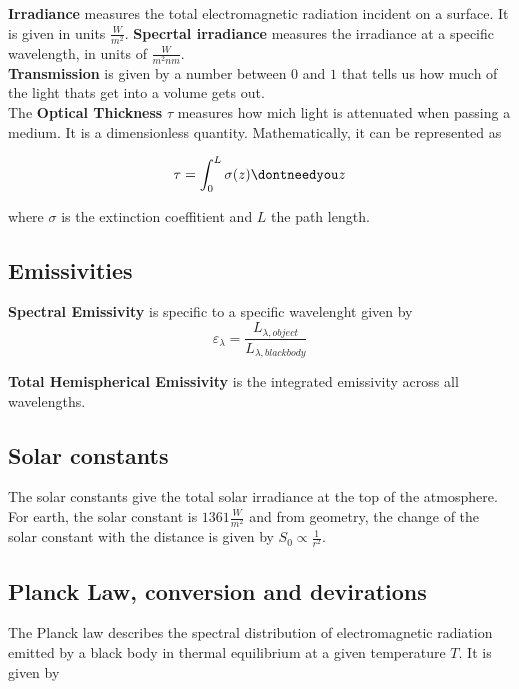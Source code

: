 \documentclass[12pt, a4paper]{article} %
\let\d\dontneedyou
\DeclareMathOperator{\d}{d}
\begin{document}
\textbf{Irradiance} measures the total electromagnetic radiation incident on a surface. It is given in units $\frac{W}{m^2}$. \textbf{Specrtal irradiance} measures the irradiance at a specific wavelength, in units of $\frac{W}{m^2nm}$. \\

\textbf{Transmission} is given by a number between $0$ and $1$ that tells us how much of the light thats get into a volume gets out. \\

The \textbf{Optical Thickness} $\tau$ measures how mich light is attenuated when passing a medium. It is a dimensionless quantity. Mathematically, it can be represented as

\begin{equation}
	\tau = \int_0^L \sigma(z) \d z
\end{equation}

where $\sigma$ is the extinction coeffitient and $L$ the path length.

\subsection{Emissivities}

\textbf{Spectral Emissivity} is specific to a specific wavelenght given by
\begin{equation}
	\varepsilon_\lambda= \frac{L_{\lambda, object}}{L_{\lambda, blackbody}}
\end{equation}

\textbf{Total Hemispherical Emissivity} is the integrated emissivity across all wavelengths.

\subsection{Solar constants}

The solar constants give the total solar irradiance at the top of the atmosphere. For earth, the solar constant is $1361 \frac{W}{m^2}$ and from geometry, the change of the solar constant with the distance is given by $S_0 \propto \frac{1}{r^2}$.

\subsection{Planck Law, conversion and devirations}

The Planck law describes the spectral distribution of electromagnetic radiation emitted by a black body in thermal equilibrium at a given temperature $T$. It is given by
\end{document}
